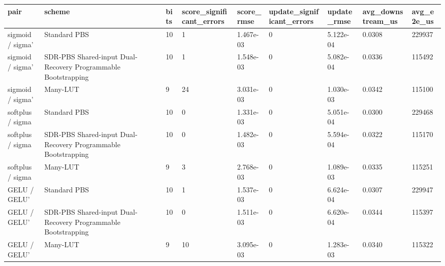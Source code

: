 \begin{tabular}{lllllllll}
\toprule
pair & scheme & bits & score\_significant\_errors & score\_rmse & update\_significant\_errors & update\_rmse & avg\_downstream\_us & avg\_e2e\_us \\
\midrule
sigmoid / sigma' & Standard PBS & 10 & 1 & 1.467e-03 & 0 & 5.122e-04 & 0.0308 & 229937 \\
sigmoid / sigma' & SDR-PBS Shared-input Dual-Recovery Programmable Bootstrapping & 10 & 1 & 1.548e-03 & 0 & 5.082e-04 & 0.0336 & 115492 \\
sigmoid / sigma' & Many-LUT & 9 & 24 & 3.031e-03 & 0 & 1.030e-03 & 0.0342 & 115100 \\
softplus / sigma & Standard PBS & 10 & 0 & 1.331e-03 & 0 & 5.051e-04 & 0.0300 & 229468 \\
softplus / sigma & SDR-PBS Shared-input Dual-Recovery Programmable Bootstrapping & 10 & 0 & 1.482e-03 & 0 & 5.594e-04 & 0.0322 & 115170 \\
softplus / sigma & Many-LUT & 9 & 3 & 2.768e-03 & 0 & 1.089e-03 & 0.0335 & 115251 \\
GELU / GELU' & Standard PBS & 10 & 1 & 1.537e-03 & 0 & 6.624e-04 & 0.0307 & 229947 \\
GELU / GELU' & SDR-PBS Shared-input Dual-Recovery Programmable Bootstrapping & 10 & 0 & 1.511e-03 & 0 & 6.620e-04 & 0.0344 & 115397 \\
GELU / GELU' & Many-LUT & 9 & 10 & 3.095e-03 & 0 & 1.283e-03 & 0.0340 & 115322 \\
\bottomrule
\end{tabular}
